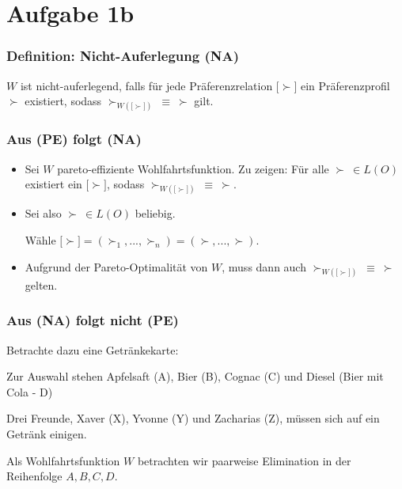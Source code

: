 \section{Aufgabe 1b}



\begin{frame}
	\frametitle{Definition: Nicht-Auferlegung (NA)}
	
	$W$ ist nicht-auferlegend, falls für jede Präferenzrelation $\lbrack \succ \rbrack$ ein Präferenzprofil $\succ$ existiert, sodass $\succ_{W(\lbrack \succ \rbrack)} ~ \equiv ~ \succ$ gilt.
	
\end{frame}


\begin{frame}
	\frametitle{Aus (PE) folgt (NA)}
	
	\begin{itemize}
	
	\item Sei $W$ pareto-effiziente Wohlfahrtsfunktion. Zu zeigen: Für alle $\succ ~ \in L(O)$ existiert ein $\lbrack \succ \rbrack$, sodass $\succ_{W(\lbrack \succ \rbrack)} ~ \equiv ~ \succ$.
	
	\item Sei also $\succ ~ \in L(O)$ beliebig.
	
	Wähle $\lbrack \succ \rbrack = (\succ_1, ..., \succ_n) = (\succ,...,\succ)$.
	
	\item Aufgrund der Pareto-Optimalität von $W$, muss dann auch $\succ_{W(\lbrack \succ \rbrack)} ~ \equiv ~ \succ$ gelten.

	\end{itemize}
\end{frame}


\begin{frame}
	\frametitle{Aus (NA) folgt nicht (PE)}
	
	Betrachte dazu eine Getränkekarte:
	
	Zur Auswahl stehen Apfelsaft (A), Bier (B), Cognac (C) und Diesel (Bier mit Cola - D)
	
	Drei Freunde, Xaver (X), Yvonne (Y) und Zacharias (Z), müssen sich auf ein Getränk einigen.
	
	Als Wohlfahrtsfunktion $W$ betrachten wir paarweise Elimination in der Reihenfolge $A,B,C,D$.
\end{frame}

